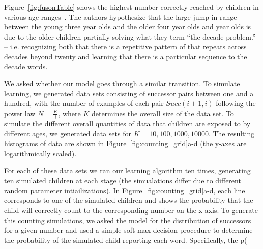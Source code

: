 \documentclass[10pt,letterpaper]{article}
\begin{document}
Figure~\ref{fig:fusonTable} shows the highest number correctly reached
by children in various age ranges~\cite{FusRicBriar1982}. The authors
hypothesize that the large jump in range between the young three year
olds and the older four year olds and year olds is due to the older
children partially solving what they term ``the decade problem.'' --
i.e. recognizing both that there is a repetitive pattern of that
repeats across decades beyond twenty and learning that there is a
particular sequence to the decade words.

We asked whether our model goes through a similar transition. To
simulate learning, we generated data sets consisting of successor
pairs between one and a hundred, with the number of examples of each
pair $Succ(i+1, i)$ following the power law $N=\frac{K}{i}$, where $K$
determines the overall size of the data set. To simulate the different
overall quantities of data that children are exposed to by different
ages, we generated data sets for $K=10, 100, 1000, 10000$. The
resulting histograms of data are shown in
Figure~\ref{fig:counting_grid}a-d (the y-axes are logarithmically
scaled). 

For each of these data sets we ran our learning algorithm ten times,
generating ten simulated children at each stage (the simualations
differ due to different random parameter intiailizations). In
Figure~\ref{fig:counting_grid}a-d, each line corresponds to one of the
simulated children and shows the probability that the child will
correctly count to the corresponding number on the x-axis. To generate
this counting simulations, we asked the model for the distribution of
successors for a given number and used a simple soft max decision procedure
to determine the probability of the simulated child reporting each
word. Specifically, the p(
\end{document}
